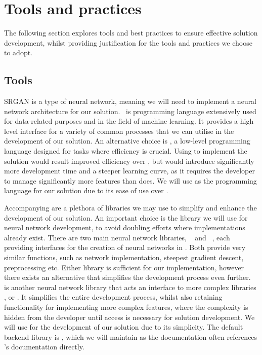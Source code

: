 \section{Tools and practices}\label{sec:tools_and_practices}
The following section explores tools and best practices to ensure effective solution development, whilst providing justification for the tools and practices we choose to adopt.

\subsection{Tools}
SRGAN is a type of neural network, meaning we will need to implement a neural network architecture for our solution.\  is programming language extensively used for data-related purposes and in the field of machine learning. It provides a high level interface for a variety of common processes that we can utilise in the development of our solution. An alternative choice is , a low-level programming language designed for tasks where efficiency is crucial. Using  to implement the solution would result improved efficiency over , but would introduce significantly more development time and a steeper learning curve, as it requires the developer to manage significantly more features than  does. We will use  as the programming language for our solution due to its ease of use over .

Accompanying  are a plethora of libraries we may use to simplify and enhance the development of our solution. An important choice is the library we will use for neural network development, to avoid doubling efforts where implementations already exist. There are two main neural network libraries, ~\cite{tensorflow} and ~\cite{pytorch}, each providing interfaces for the creation of neural networks in . Both provide very similar functions, such as network implementation, steepest gradient descent, preprocessing etc. Either library is sufficient for our implementation, however there exists an alternative that simplifies the development process even further.\ ~\cite{keras} is another neural network library that acts an interface to more complex libraries ,  or . It simplifies the entire development process, whilst also retaining functionality for implementing more complex features, where the complexity is hidden from the developer until access is necessary for solution development. We will use  for the development of our solution due to its simplicity. The default backend library is , which we will maintain as the  documentation often references 's documentation directly.

